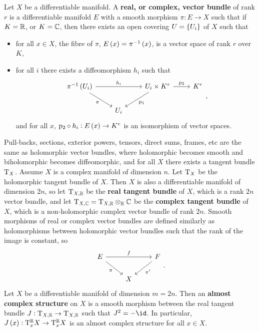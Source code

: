 \begin{definition}
Let $ X $ be a differentiable manifold. A \textbf{real, or complex, vector bundle} of rank $ r $ is a differentiable manifold $ E $ with a smooth morphism $ \pi : E \to X $ such that if $ K = \mathbb{R} $, or $ K = \mathbb{C} $, then there exists an open covering $ U = \cbr{U_i} $ of $ X $ such that
\begin{itemize}
\item for all $ x \in X $, the fibre of $ \pi $, $ E\br{x} = \pi^{-1}\br{x} $, is a vector space of rank $ r $ over $ K $,
\item for all $ i $ there exists a diffeomorphism $ h_i $ such that
$$
\begin{tikzcd}
\pi^{-1}\br{U_i} \arrow{rr}{h_i} \arrow[swap]{dr}{\pi} & & U_i \times K^r \arrow{r}{\p_2} \arrow{dl}{\p_1} & K^r \\
& U_i & &
\end{tikzcd},
$$
and for all $ x $, $ \p_2 \circ h_i : E\br{x} \to K^r $ is an isomorphism of vector spaces.
\end{itemize}
\end{definition}

Pull-backs, sections, exterior powers, tensors, direct sums, frames, etc are the same as holomorphic vector bundles, where holomorphic becomes smooth and biholomorphic becomes diffeomorphic, and for all $ X $ there exists a tangent bundle $ \mathrm{T}_X $. Assume $ X $ is a complex manifold of dimension $ n $. Let $ \mathrm{T}_X $ be the holomorphic tangent bundle of $ X $. Then $ X $ is also a differentiable manifold of dimension $ 2n $, so let $ \mathrm{T}_{X, \mathbb{R}} $ be the \textbf{real tangent bundle} of $ X $, which is a rank $ 2n $ vector bundle, and let $ \mathrm{T}_{X, \mathbb{C}} = \mathrm{T}_{X, \mathbb{R}} \otimes_{\mathbb{R}} \mathbb{C} $ be the \textbf{complex tangent bundle} of $ X $, which is a non-holomorphic complex vector bundle of rank $ 2n $. Smooth morphisms of real or complex vector bundles are defined similarly as holomorphisms between holomorphic vector bundles such that the rank of the image is constant, so
$$
\begin{tikzcd}
E \arrow{rr}{f} \arrow[swap]{dr}{\pi} & & F \arrow{dl}{\pi'} \\
& X &
\end{tikzcd}.
$$
Let $ X $ be a differentiable manifold of dimension $ m = 2n $. Then an \textbf{almost complex structure} on $ X $ is a smooth morphism between the real tangent bundle $ J : \mathrm{T}_{X, \mathbb{R}} \to \mathrm{T}_{X, \mathbb{R}} $ such that $ J^2 = -\id $. In particular, $ J\br{x} : \T_x^\RR X \to \T_x^\RR X $ is an almost complex structure for all $ x \in X $.

